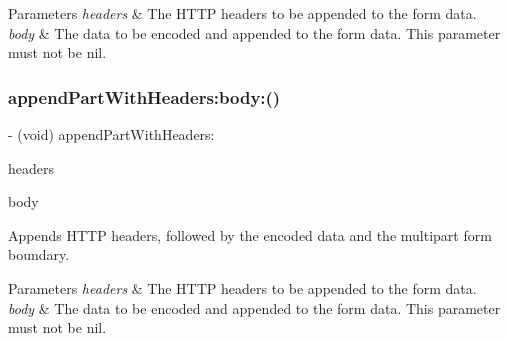 \begin{DoxyParams}{Parameters}
{\em headers} & The H\+T\+TP headers to be appended to the form data. \\
\hline
{\em body} & The data to be encoded and appended to the form data. This parameter must not be {\ttfamily nil}. \\
\hline
\end{DoxyParams}
\mbox{\label{protocol_a_f_multipart_form_data-p_a536920b65bcc076f33cb823ebb76ecc0}} 
\subsubsection{\texorpdfstring{append\+Part\+With\+Headers\+:body\+:()}{appendPartWithHeaders:body:()}\hspace{0.1cm}{\footnotesize\ttfamily [2/3]}}
{\footnotesize\ttfamily -\/ (void) append\+Part\+With\+Headers\+: \begin{DoxyParamCaption}\item[{(nullable N\+S\+Dictionary $\ast$)}]{headers }\item[{body:(N\+S\+Data $\ast$)}]{body }\end{DoxyParamCaption}}

Appends H\+T\+TP headers, followed by the encoded data and the multipart form boundary.


\begin{DoxyParams}{Parameters}
{\em headers} & The H\+T\+TP headers to be appended to the form data. \\
\hline
{\em body} & The data to be encoded and appended to the form data. This parameter must not be {\ttfamily nil}. \\
\hline
\end{DoxyParams}
\mbox{\label{protocol_a_f_multipart_form_data-p_a536920b65bcc076f33cb823ebb76ecc0}} 
